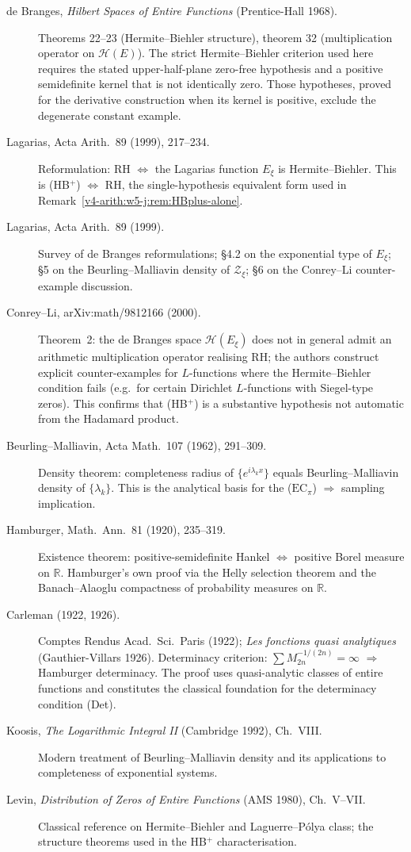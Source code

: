 \begin{description}
\item[de Branges, \emph{Hilbert Spaces of Entire Functions}
(Prentice-Hall 1968).] Theorems 22--23 (Hermite--Biehler
structure), theorem 32 (multiplication operator on
\(\mathcal{H}(E)\)). The strict Hermite--Biehler criterion used here requires the
stated upper-half-plane zero-free hypothesis and a positive
semidefinite kernel that is not identically zero. Those hypotheses,
proved for the derivative construction when its kernel is positive,
exclude the degenerate constant example.
\item[Lagarias, Acta Arith.~89 (1999), 217--234.] Reformulation:
RH \(\Leftrightarrow\) the Lagarias function \(E_{\xi}\) is
Hermite--Biehler. This is (HB\(^{+}\)) \(\Leftrightarrow\) RH, the
single-hypothesis equivalent form used in
Remark~\ref{v4-arith:w5-j:rem:HBplus-alone}.
\item[Lagarias, Acta Arith.~89 (1999).] Survey of de Branges
reformulations; \S4.2 on the exponential type of \(E_{\xi}\); \S5
on the Beurling--Malliavin density of \(\mathcal{Z}_{\xi}\); \S6
on the Conrey--Li counter-example discussion.
\item[Conrey--Li, arXiv:math/9812166 (2000).] Theorem~2: the
de Branges space \(\mathcal{H}(E_{\xi})\) does not in general
admit an arithmetic multiplication operator realising RH; the
authors construct explicit counter-examples for \(L\)-functions
where the Hermite--Biehler condition fails (e.g.~for certain
Dirichlet \(L\)-functions with Siegel-type zeros). This confirms
that (HB\(^{+}\)) is a substantive hypothesis not automatic from
the Hadamard product.
\item[Beurling--Malliavin, Acta Math.~107 (1962), 291--309.]
Density theorem: completeness radius of
\(\{e^{i\lambda_{k}x}\}\) equals Beurling--Malliavin density of
\(\{\lambda_{k}\}\). This is the analytical basis for the
(\(\mathrm{EC}_\pi\)) \(\Rightarrow\) sampling implication.
\item[Hamburger, Math.~Ann.~81 (1920), 235--319.] Existence
theorem: positive-semidefinite Hankel \(\Leftrightarrow\) positive
Borel measure on \(\mathbb{R}\). Hamburger's own proof via the
Helly selection theorem and the Banach--Alaoglu compactness of
probability measures on \(\mathbb{R}\).
\item[Carleman (1922, 1926).] Comptes Rendus Acad.~Sci.~Paris
(1922); \emph{Les fonctions quasi analytiques}
(Gauthier-Villars 1926). Determinacy criterion: \(\sum M_{2n}^{-1/(2n)}=\infty\)
\(\Rightarrow\) Hamburger determinacy. The proof uses
quasi-analytic classes of entire functions and constitutes the
classical foundation for the determinacy condition (Det).
\item[Koosis, \emph{The Logarithmic Integral II} (Cambridge 1992),
Ch.~VIII.] Modern treatment of Beurling--Malliavin density and
its applications to completeness of exponential systems.
\item[Levin, \emph{Distribution of Zeros of Entire Functions}
(AMS 1980), Ch.~V--VII.] Classical reference on Hermite--Biehler
and Laguerre--P\'olya class; the structure theorems used in the
HB\(^{+}\) characterisation.
\end{description}

